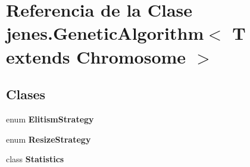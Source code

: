 \hypertarget{classjenes_1_1_genetic_algorithm_3_01_t_01extends_01_chromosome_01_4}{\section{Referencia de la Clase jenes.\-Genetic\-Algorithm$<$ T extends Chromosome $>$}
\label{classjenes_1_1_genetic_algorithm_3_01_t_01extends_01_chromosome_01_4}
}
\subsection*{Clases}
\begin{DoxyCompactItemize}
\item 
enum {\bfseries Elitism\-Strategy}
\item 
enum {\bfseries Resize\-Strategy}
\item 
class {\bfseries Statistics}
\end{DoxyCompactItemize}
